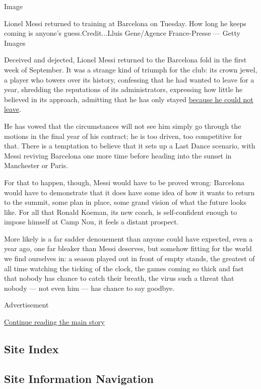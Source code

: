 Image

Lionel Messi returned to training at Barcelona on Tuesday. How long he
keeps coming is anyone's guess.Credit...Lluis Gene/Agence France-Presse
--- Getty Images

Deceived and dejected, Lionel Messi returned to the Barcelona fold in
the first week of September. It was a strange kind of triumph for the
club: its crown jewel, a player who towers over its history, confessing
that he had wanted to leave for a year, shredding the reputations of its
administrators, expressing how little he believed in its approach,
admitting that he has only stayed
\href{https://www.nytimes3xbfgragh.onion/2020/09/04/sports/soccer/lionel-messi-barcelona.html}{because
he could not leave}.

He has vowed that the circumstances will not see him simply go through
the motions in the final year of his contract; he is too driven, too
competitive for that. There is a temptation to believe that it sets up a
Last Dance scenario, with Messi reviving Barcelona one more time before
heading into the sunset in Manchester or Paris.

For that to happen, though, Messi would have to be proved wrong:
Barcelona would have to demonstrate that it does have some idea of how
it wants to return to the summit, some plan in place, some grand vision
of what the future looks like. For all that Ronald Koeman, its new
coach, is self-confident enough to impose himself at Camp Nou, it feels
a distant prospect.

More likely is a far sadder denouement than anyone could have expected,
even a year ago, one far bleaker than Messi deserves, but somehow
fitting for the world we find ourselves in: a season played out in front
of empty stands, the greatest of all time watching the ticking of the
clock, the games coming so thick and fast that nobody has chance to
catch their breath, the virus such a threat that nobody --- not even him
--- has chance to say goodbye.

Advertisement

\protect\hyperlink{after-bottom}{Continue reading the main story}

\hypertarget{site-index}{%
\subsection{Site Index}\label{site-index}}

\hypertarget{site-information-navigation}{%
\subsection{Site Information
Navigation}\label{site-information-navigation}}

